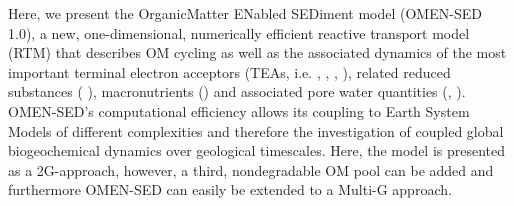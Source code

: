 \documentclass[gmd, manuscript]{copernicus}
\begin{document}


Here, we present the OrganicMatter ENabled SEDiment model (OMEN-SED 1.0), a new, one-dimensional, numerically efficient reactive transport model (RTM) 
that describes OM cycling as well as the associated dynamics of the most important terminal electron acceptors (TEAs, i.e. , , , ), 
related reduced substances ( ), macronutrients () and associated pore water quantities (, ).  
OMEN-SED's computational efficiency allows its coupling to Earth System Models of different complexities and therefore the investigation of coupled global biogeochemical dynamics over geological timescales. 
Here, the model is presented as a 2G-approach, however, a third, nondegradable OM pool can be added and furthermore OMEN-SED can easily be extended to a Multi-G approach. 
\end{document}
